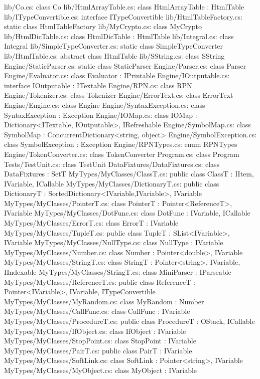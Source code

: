 lib/Co.cs:	class Co 
lib/HtmlArrayTable.cs:	class HtmlArrayTable : HtmlTable 
lib/ITypeConvertible.cs:	interface ITypeConvertible 
lib/HtmlTableFactory.cs:	static class HtmlTableFactory 
lib/MyCrypto.cs:	class MyCrypto 
lib/HtmlDicTable.cs:	class HtmlDicTable : HtmlTable 
lib/Integral.cs:	class Integral 
lib/SimpleTypeConverter.cs:	static class SimpleTypeConverter 
lib/HtmlTable.cs:	abstract class HtmlTable 
lib/SString.cs:	class SString 
Engine/StaticParser.cs:	static class StaticParser 
Engine/Parser.cs:	class Parser 
Engine/Evaluator.cs:	class Evaluator : IPrintable 
Engine/IOutputable.cs:	interface IOutputable : ITextable 
Engine/RPN.cs:	class RPN 
Engine/Tokenizer.cs:	class Tokenizer 
Engine/ErrorText.cs:	class ErrorText 
Engine/Engine.cs:	class Engine 
Engine/SyntaxException.cs:	class SyntaxException : Exception 
Engine/IOMap.cs:	class IOMap : Dictionary<ITextable, IOutputable>, IRefreshable 
Engine/SymbolMap.cs:	class SymbolMap : ConcurrentDictionary<string, object> 
Engine/SymbolException.cs:	class SymbolException : Exception 
Engine/RPNTypes.cs:	enum RPNTypes 
Engine/TokenConverter.cs:	class TokenConverter 
Program.cs:	class Program 
Tests/TestUnit.cs:    class TestUnit 
DataFixtures/DataFixtures.cs:	class DataFixtures : SetT 
MyTypes/MyClasses/ClassT.cs:	public class ClassT : IItem, IVariable, ICallable 
MyTypes/MyClasses/DictionaryT.cs:	public class DictionaryT : SortedDictionary<IVariable,IVariable>, IVariable 
MyTypes/MyClasses/PointerT.cs:	class PointerT : Pointer<ReferenceT>, IVariable 
MyTypes/MyClasses/DotFunc.cs:	class DotFunc : IVariable, ICallable  
MyTypes/MyClasses/ErrorT.cs:	class ErrorT : IVariable 
MyTypes/MyClasses/TupleT.cs:	public class TupleT : SList<IVariable>, IVariable 
MyTypes/MyClasses/NullType.cs:	class NullType : IVariable 
MyTypes/MyClasses/Number.cs:	class Number : Pointer<double>, IVariable 
MyTypes/MyClasses/StringT.cs:	class StringT : Pointer<string>, IVariable, IIndexable 
MyTypes/MyClasses/StringT.cs:		class MiniParser : IParseable 
MyTypes/MyClasses/ReferenceT.cs:	public class ReferenceT : Pointer<IVariable>, IVariable, ITypeConvertible 
MyTypes/MyClasses/MyRandom.cs:	class MyRandom : Number 
MyTypes/MyClasses/CallFunc.cs:	class CallFunc : IVariable 
MyTypes/MyClasses/ProcedureT.cs:	public class ProcedureT : OStack, ICallable  
MyTypes/MyClasses/IfObject.cs:	class IfObject : IVariable 
MyTypes/MyClasses/StopPoint.cs:	class StopPoint : IVariable 
MyTypes/MyClasses/PairT.cs:	public class PairT : IVariable 
MyTypes/MyClasses/SoftLink.cs:	class SoftLink : Pointer<string>, IVariable 
MyTypes/MyClasses/MyObject.cs:	class MyObject : IVariable 
